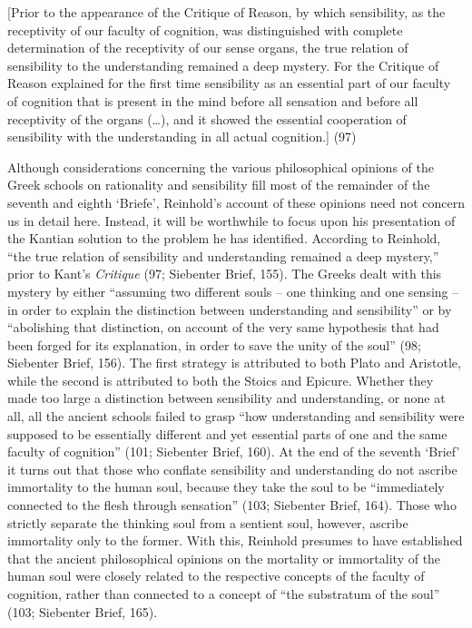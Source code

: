 [Prior to the appearance of the Critique of Reason, by which sensibility, as the receptivity of our faculty of cognition, was distinguished with complete determination of the receptivity of our sense organs, the true relation of sensibility to the understanding remained a deep mystery. For the Critique of Reason explained for the first time sensibility as an essential part of our faculty of cognition that is present in the mind before all sensation and before all receptivity of the organs (\ldots ), and it showed the essential cooperation of sensibility with the understanding in all actual cognition.] (97)

Although considerations concerning the various philosophical opinions of the Greek schools on rationality and sensibility fill most of the remainder of the seventh and eighth `Briefe', Reinhold's account of these opinions need not concern us in detail here. Instead, it will be worthwhile to focus upon his presentation of the Kantian solution to the problem he has identified. According to Reinhold, ``the true relation of sensibility and understanding remained a deep mystery,'' prior to Kant's \textit{Critique} (97; Siebenter Brief, 155). The Greeks dealt with this mystery by either ``assuming two different souls {--} one thinking and one sensing {--} in order to explain the distinction between understanding and sensibility'' or by ``abolishing that distinction, on account of the very same hypothesis that had been forged for its explanation, in order to save the unity of the soul'' (98; Siebenter Brief, 156). The first strategy is attributed to both Plato and Aristotle, while the second is attributed to both the Stoics and Epicure. Whether they made too large a distinction between sensibility and understanding, or none at all, all the ancient schools failed to grasp ``how understanding and sensibility were supposed to be essentially different and yet essential parts of one and the same faculty of cognition'' (101; Siebenter Brief, 160). At the end of the seventh `Brief' it turns out that those who conflate sensibility and understanding do not ascribe immortality to the human soul, because they take the soul to be ``immediately connected to the flesh through sensation'' (103; Siebenter Brief, 164). Those who strictly separate the thinking soul from a sentient soul, however, ascribe immortality only to the former. With this, Reinhold presumes to have established that the ancient philosophical opinions on the mortality or immortality of the human soul were closely related to the respective concepts of the faculty of cognition, rather than connected to a concept of ``the substratum of the soul'' (103; Siebenter Brief, 165).

